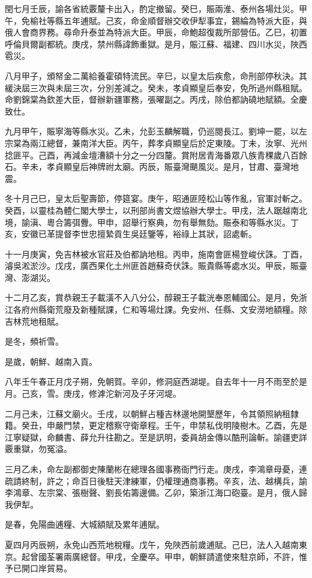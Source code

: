 \begin{pinyinscope}
閏七月壬辰，諭各省統覈釐卡出入，酌定撤留。癸巳，賑兩淮、泰州各場灶災。甲午，免榆社等縣五年逋賦。己亥，命金順督辦交收伊犁事宜，錫綸為特派大臣，與俄人會商界務。尋命升泰並為特派大臣。甲辰，命鮑超復裁所部營伍。乙巳，初置呼倫貝爾副都統。庚戌，禁州縣諱飾重獄。是月，賑江蘇、福建、四川水災，陜西雹災。

八月甲子，頒帑金二萬給養霍碩特流民。辛巳，以皇太后疾愈，命刑部停秋決。其緩決屆三次與未屆三次，分別差減之。癸未，孝貞顯皇后奉安，免所過州縣租賦。命劉錦棠為欽差大臣，督辦新疆軍務，張曜副之。丙戌，除伯都訥磽地賦額。全慶致仕。

九月甲午，賑寧海等縣水災。乙未，允彭玉麟解職，仍巡閱長江。劉坤一罷，以左宗棠為兩江總督，兼南洋大臣。丙午，葬孝貞顯皇后於定東陵。丁未，汝寧、光州捻匪平。己酉，再減金壇漕額十分之一分四釐。賞附居青海番眾八族青稞歲八百餘石。辛未，孝貞顯皇后神牌祔太廟。丙辰，賑臺灣颶風災。是月，甘肅、臺灣地震。

冬十月己巳，皇太后聖壽節，停筵宴。庚午，昭通匪陸松山等作亂，官軍討斬之。癸酉，以靈桂為體仁閣大學士，以刑部尚書文煜協辦大學士。甲戌，法人踞越南北境，諭滇、粵合籌弭釁。甲申，詔舉行察典，勿有舉無劾。賑泰和等縣水災。丁亥，安徽已革提督李世忠擅縶貢生吳廷鑒等，裕祿上其狀，詔處斬。

十一月庚寅，免吉林被水官莊及伯都訥地租。丙申，施南會匪楊登峻伏誅。丁酉，濬吳淞淤沙。戊戌，廣西果化土州匪首趙蘇奇伏誅。賑貴縣等處水災。甲辰，賑臺灣、澎湖災。

十二月乙亥，賞恭親王子載潢不入八分公，醇親王子載洸奉恩輔國公。是月，免浙江各府州縣衛荒廢及新種賦課，仁和等場灶課。免安州、任縣、文安澇地額糧。除吉林荒地租賦。

是冬，頻祈雪。

是歲，朝鮮、越南入貢。

八年壬午春正月戊子朔，免朝賀。辛卯，修洞庭西湖堤。自去年十一月不雨至於是月。己亥，雪。庚戌，修滹沱新河及子牙河堤。

二月己未，江蘇文廟火。壬戌，以朝鮮占種吉林邊地開墾歷年，令其領照納租隸籍。癸丑，申嚴門禁，更定稽察守衛章程。壬午，申禁私伐明陵樹木。乙酉，先是江寧疑獄，命麟書、薛允升往勘之。至是訊明，委員胡金傳以酷刑論斬。諭疆吏詳覈重獄，勿冤溢。

三月乙未，命左副都御史陳蘭彬在總理各國事務衙門行走。庚戌，李鴻章母憂，連疏請終制，許之；命百日後駐天津練軍，仍權理通商事務。辛亥，法、越構兵，諭李鴻章、左宗棠、張樹聲、劉長佑籌邊備。乙卯，築浙江海口砲臺。是月，俄人歸我伊犁。

是春，免陽曲逋糧、大城額賦及累年逋賦。

夏四月丙辰朔，永免山西荒地稅糧。戊午，免陜西前歲逋賦。己巳，法人入越南東京。起曾國荃署兩廣總督。甲戌，全慶卒。甲申，朝鮮請遣使來駐京師，不許，惟予已開口岸貿易。


\end{pinyinscope}

